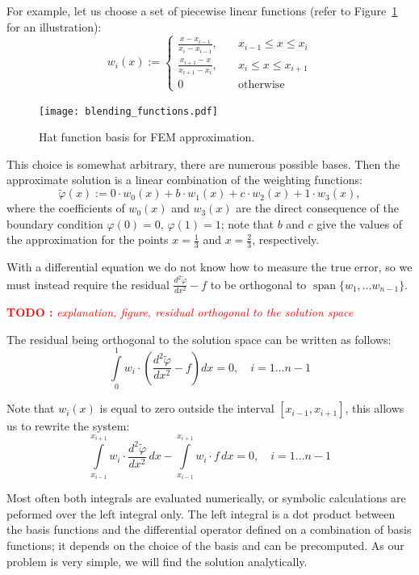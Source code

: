 \documentclass[notitlepage,oneside]{book}
\DeclareMathOperator{\Span}{span}
\newcommand\TODO[1]{\textcolor{red}{{\bf TODO :} \it #1}}
\begin{document}
For example, let us choose a set of piecewise linear functions (refer to Figure~\ref{fig:fem:blending} for an illustration):
$$
w_i(x) := \left\{
\begin{split}
\frac{x-x_{i-1}}{x_i-x_{i-1}}, & \quad x_{i-1}\leq x \leq x_i \\
\frac{x_{i+1}-x}{x_{i+1}-x_i}, & \quad x_i\leq x \leq x_{i+1}\\
0 & \quad \text{otherwise}
\end{split}
\right.
$$

\begin{figure}[ht]
	\centering
	\texttt{[image: blending\_functions.pdf]}
	\caption{Hat function basis for FEM approximation.}
	\label{fig:fem:blending}
\end{figure}

This choice is somewhat arbitrary, there are numerous possible bases.
Then the approximate solution is a linear combination of the weighting functions:
$$
\tilde{\varphi}(x) := 0\cdot w_0(x) + b\cdot w_1(x) + c\cdot w_2(x) + 1\cdot w_3(x),
$$
where the coefficients of $w_0(x)$ and $w_3(x)$ are the direct consequence of the boundary condition $\varphi(0)=0$, $\varphi(1)=1$;
note that $b$ and $c$ give the values of the approximation for the points $x=\frac{1}{3}$ and $x=\frac{2}{3}$, respectively.

With a differential equation we do not know how to measure the true error, 
so we must instead require the residual $\frac{d^2\tilde{\varphi}}{dx^2} - f$ to be orthogonal to $\Span\{w_1,\dots w_{n-1}\}$.

\TODO{explanation, figure, residual orthogonal to the solution space}


The residual being orthogonal to the solution space can be written as follows:
$$
\int\limits_0^1 w_i \cdot \left(\frac{d^2\tilde{\varphi}}{dx^2} - f\right) dx = 0, \quad i = 1\dots n-1 
$$

Note that $w_i(x)$ is equal to zero outside the interval $[x_{i-1}, x_{i+1}]$, this allows us to rewrite the system:
$$
\int\limits_{x_{i-1}}^{x_{i+1}} w_i \cdot \frac{d^2\tilde{\varphi}}{dx^2}\,dx - \int\limits_{x_{i-1}}^{x_{i+1}} w_i\cdot f\,dx = 0, \quad i = 1\dots n-1
$$

Most often both integrals are evaluated numerically, or symbolic calculations are peformed over the left integral only.
The left integral is a dot product between the basis functions and the differential operator defined on a combination of basis functions;
it depends on the choice of the basis and can be precomputed.
As our problem is very simple, we will find the solution analytically.
\end{document}
